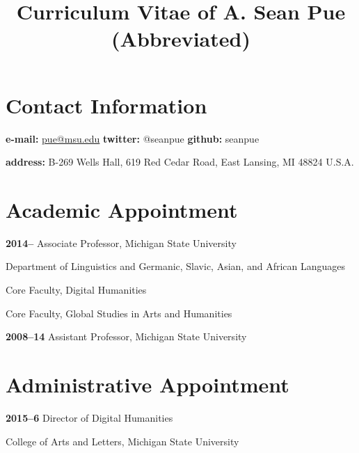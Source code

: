 \documentclass[letterpaper,12pt]{article}
\title{\phantomsection%
  Curriculum Vitae of A. Sean Pue (Abbreviated)%
  \label{curriculum-vitae-of-a-sean-pue-abbreviated}}
\author{}
\date{}
\newenvironment{DUlineblock}[1]{%
    \list{}{\setlength{\partopsep}{\parskip}
            \addtolength{\partopsep}{\baselineskip}
            \setlength{\topsep}{0pt}
            \setlength{\itemsep}{0.15\baselineskip}
            \setlength{\parsep}{0pt}
            \setlength{\leftmargin}{#1}}
    \raggedright
  }
  {\endlist}
\begin{document}
\maketitle


\section{Contact Information%
  \label{contact-information}%
}

\begin{DUlineblock}{0em}
\item[] \textbf{e-mail:}
\href{mailto:pue@msu.edu}{pue@msu.edu}
\textbf{twitter:}
@seanpue
\textbf{github:}
seanpue
\item[] \textbf{address:}
B-269 Wells Hall, 619 Red Cedar Road, East Lansing, MI 48824 U.S.A.
\end{DUlineblock}


\section{Academic Appointment%
  \label{academic-appointment}%
}

\begin{DUlineblock}{0em}
\item[] \textbf{2014–}
Associate Professor, Michigan State University
\item[]
\begin{DUlineblock}{\DUlineblockindent}
\item[] Department of Linguistics and Germanic, Slavic, Asian, and African Languages
\item[] Core Faculty, Digital Humanities
\item[] Core Faculty, Global Studies in Arts and Humanities
\end{DUlineblock}
\item[] \textbf{2008–14}
Assistant Professor, Michigan State University
\end{DUlineblock}


\section{Administrative Appointment%
  \label{administrative-appointment}%
}

\begin{DUlineblock}{0em}
\item[] \textbf{2015–6}
Director of Digital Humanities
\item[]
\begin{DUlineblock}{\DUlineblockindent}
\item[] College of Arts and Letters, Michigan State University
\end{DUlineblock}
\end{DUlineblock}
\end{document}
